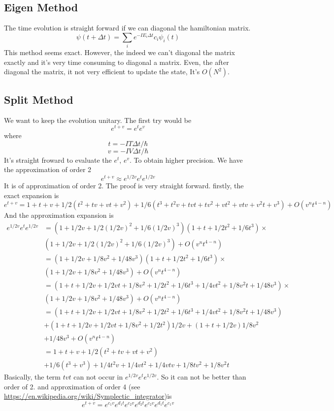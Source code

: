 \documentclass[12pt,twoside]{article}
\begin{document}
\subsection{Eigen Method}
The time evolution is straight forward if we can diagonal the hamiltonian matrix.
$$
\psi(t+\Delta t) = \sum_i e^{-I E_i \Delta t}c_i \psi_i(t)
$$
This method seems exact. However, the indeed we can't diagonal the matrix exactly and it's very time consuming to diagonal a matrix.
Even, the after diagonal the matrix, it not very efficient to update the state, It's $O(N^2)$.

\subsection{Split Method}

We want to keep the evolution unitary. The first try would be
$$
e^{t+v}=e^t e^v
$$
where
$$
t=-I T\Delta t/\hbar
$$
$$
v=-I V\Delta t/\hbar
$$
It's straight froward to evaluate the $e^t$, $e^v$. To obtain higher precision. We have the approximation of order 2
$$
e^{t+v} \approx e^{1/2 v} e^{ t} e^{1/2 v}
$$
It is of approximation of order 2. The proof is very straight forward.
firstly, the exact expansion is
$$
e^{t+v} = 1 + t + v + 1/2 (t^2 + tv + vt + v^2) + 1/6 (t^3 + t^2v + tvt + tv^2 + vt^2 + vtv + v^2t + v^3) + O(v^nt^{4-n})
$$
And the approximation expansion is
\begin{align*}
e^{1/2 v} e^{ t} e^{1/2 v} &=(1 + 1/2v + 1/2(1/2v)^2+1/6 (1/2v)^3) (1 + t + 1/2t^2+1/6 t^3)\times\\
&(1 + 1/2v + 1/2(1/2v)^2+1/6 (1/2v)^3)+ O(v^nt^{4-n})\\
&=(1 + 1/2v + 1/8v^2+1/48 v^3) (1 + t + 1/2t^2+1/6 t^3)\times\\ 
&(1 + 1/2v + 1/8v^2+1/48 v^3)+ O(v^nt^{4-n})\\
&=(1 + t + 1/2v + 1/2 vt + 1/8 v^2 + 1/2t^2 + 1/6 t^3  + 1/4 vt^2+ 1/8 v^2t + 1/48 v^3)\times\\ 
&(1 + 1/2v + 1/8v^2+1/48 v^3)+ O(v^nt^{4-n})\\
&=(1 + t + 1/2v + 1/2 vt + 1/8 v^2 + 1/2t^2 + 1/6 t^3  + 1/4 vt^2+ 1/8 v^2t + 1/48 v^3)\\
&+ (1 + t + 1/2v + 1/2 vt + 1/8 v^2 + 1/2t^2)1/2v
+ (1 + t + 1/2v)1/8v^2\\
&+ 1/48v^3 + O(v^nt^{4-n})\\
&= 1 + t + v + 1/2 (t^2 + tv + vt + v^2)\\
&+ 1/6(t^3 + v^3) + 1/4 t^2 v + 1/4 v t^2 + 1/4 vtv + 1/8 tv^2 + 1/8 v^2 t
\end{align*}
Basically, the term $tvt$ can not occur in $e^{1/2 v} e^{ t} e^{1/2 v}$. So it can not be better than order of 2.
and approximation of order 4 (see \url{https://en.wikipedia.org/wiki/Symplectic_integrator})is
$$
e^{t+v} = e^{c_1 v} e^{d_1 t} e^{c_2 v} e^{d_2 t} e^{ c_2 v} e^{ d_1 t} e^{ c_1 v}
$$
\end{document}

